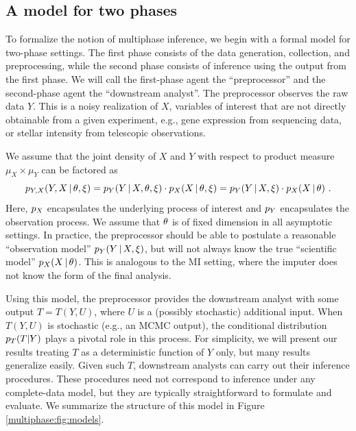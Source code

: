 \subsection{A model for two phases}
\label{multiphase:sec:model}

To formalize the notion of multiphase inference, we begin with a formal model for two-phase settings.
The first phase consists of the data generation, collection, and preprocessing, while the second phase consists of inference using the output from the first phase.
We will call the first-phase agent the ``preprocessor'' and the second-phase agent the ``downstream analyst''.
The preprocessor observes the raw data $Y$.
This is a noisy realization of $X$, variables of interest that are not directly obtainable from a given experiment, e.g., gene expression from sequencing data, or stellar intensity from telescopic observations.

We assume that the joint density of $X$ and $Y$ with respect to product measure $\mu_X \times \mu_Y$ can be factored as 
\begin{equation}\label{multiphase:e:model}
 p_{Y,X}(Y,X \given \param, \obsparam) = \pobs(Y \given X, \param, \obsparam) \cdot\psci(X \given \param, \obsparam) = \pobs(Y \given X, \obsparam) \cdot \psci(X \given \param) \ .
\end{equation}
Here, $p_X$ encapsulates the underlying process of interest and $p_Y$ encapsulates the observation process.
We assume that $\theta$ is of fixed dimension in all asymptotic settings.
In practice, the preprocessor should be able to postulate a reasonable ``observation model'' $p_Y(Y \, | \, X, \xi)$, but will not always know the true ``scientific model'' $p_X(X \, | \, \theta)$.
This is analogous to the MI setting, where the imputer does not know the form of the final analysis.

Using this model, the preprocessor provides the downstream analyst with some output $T = T(Y, U)$, where $U$ is a (possibly stochastic) additional input.
When $T(Y, U)$ is stochastic (e.g., an MCMC output), the conditional distribution $p_T(T|Y)$ plays a pivotal role in this process. For simplicity, we will present our results treating $T$ as a deterministic function of $Y$ only, but many results generalize easily.
Given such $T$, downstream analysts can carry out their inference procedures.
These procedures  need not correspond to inference under any  complete-data model, but they are typically  straightforward to formulate and evaluate.
We summarize the structure of this model in Figure \ref{multiphase:fig:models}.

